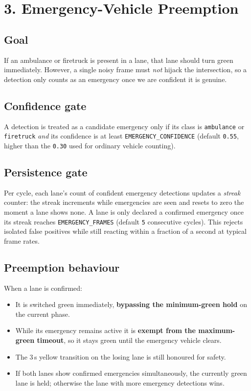 \documentclass[11pt]{article}
\begin{document}
\section{3. Emergency-Vehicle Preemption}
\subsection{Goal}
If an ambulance or firetruck is present in a lane, that lane should turn green
immediately. However, a single noisy frame must \emph{not} hijack the
intersection, so a detection only counts as an emergency once we are confident
it is genuine.

\subsection{Confidence gate}
A detection is treated as a candidate emergency only if its class is
\texttt{ambulance} or \texttt{firetruck} \emph{and} its confidence is at least
\texttt{EMERGENCY\_CONFIDENCE} (default \texttt{0.55}, higher than the
\texttt{0.30} used for ordinary vehicle counting).

\subsection{Persistence gate}
Per cycle, each lane's count of confident emergency detections updates a
\emph{streak} counter: the streak increments while emergencies are seen and
resets to zero the moment a lane shows none. A lane is only declared a
confirmed emergency once its streak reaches \texttt{EMERGENCY\_FRAMES}
(default \texttt{5} consecutive cycles). This rejects isolated false positives
while still reacting within a fraction of a second at typical frame rates.

\subsection{Preemption behaviour}
When a lane is confirmed:
\begin{itemize}[nosep]
  \item It is switched green immediately, \textbf{bypassing the minimum-green
        hold} on the current phase.
  \item While its emergency remains active it is \textbf{exempt from the
        maximum-green timeout}, so it stays green until the emergency vehicle
        clears.
  \item The 3\,s yellow transition on the losing lane is still honoured for
        safety.
  \item If both lanes show confirmed emergencies simultaneously, the currently
        green lane is held; otherwise the lane with more emergency detections
        wins.
\end{itemize}
\end{document}
